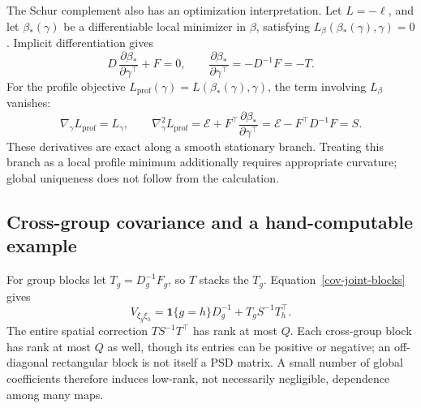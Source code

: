 The Schur complement also has an optimization interpretation.  Let
$L=-\ell$, and let $\beta_*(\gamma)$ be a differentiable local minimizer
in $\beta$, satisfying $L_\beta(\beta_*(\gamma),\gamma)=0$.
Implicit differentiation gives
\[
 D\,\frac{\partial\beta_*}{\partial\gamma^\top}+F=0,
 \qquad \frac{\partial\beta_*}{\partial\gamma^\top}=-D^{-1}F=-T .
\]
For the profile objective $L_{\mathrm{prof}}(\gamma)=
L(\beta_*(\gamma),\gamma)$, the term involving $L_\beta$ vanishes:
\[
 \nabla_\gamma L_{\mathrm{prof}}=L_\gamma,\qquad
 \nabla_\gamma^2L_{\mathrm{prof}}
 =\mathcal E+F^\top\frac{\partial\beta_*}{\partial\gamma^\top}
 =\mathcal E-F^\top D^{-1}F=S .
\]
These derivatives are exact along a smooth stationary branch.  Treating
this branch as a local profile minimum additionally requires appropriate
curvature; global uniqueness does not follow from the calculation.

\subsection{Cross-group covariance and a hand-computable example}
\label{cov-example}

For group blocks let $T_g=D_g^{-1}F_g$, so $T$ stacks the $T_g$.
Equation~\eqref{cov-joint-blocks} gives
\begin{equation}
 V_{\xi_g\xi_h}=\mathbf1\{g=h\}D_g^{-1}+T_gS^{-1}T_h^\top .
 \label{cov-cross-group}
\end{equation}
The entire spatial correction $TS^{-1}T^\top$ has rank at most $Q$.
Each cross-group block has rank at most $Q$ as well, though its entries
can be positive or negative; an off-diagonal rectangular block is not
itself a PSD matrix.  A small number of global coefficients therefore
induces low-rank, not necessarily negligible, dependence among many maps.

